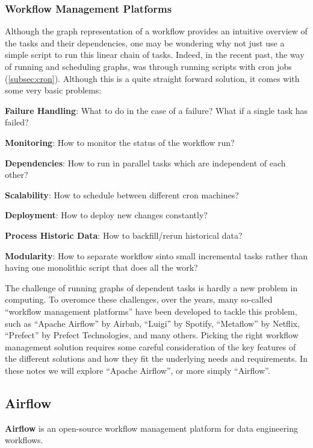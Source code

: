 \subsubsection{Workflow Management Platforms}

Although the graph representation of a workflow provides an intuitive overview of the tasks and their dependencies,
one may be wondering why not just use a simple script to run this linear chain of tasks. Indeed, in the recent past,
the way of running and scheduling graphs, was through running scripts with cron jobs (\ref{subsec:cron}). Although this
is a quite straight forward solution, it comes with some very basic problems:
\bit
\item \textbf{Failure Handling}: What to do in the case of a failure? What if a single task has failed?
\item \textbf{Monitoring}: How to monitor the status of the workflow run?
\item \textbf{Dependencies}: How to run in parallel tasks which are independent of each other?
\item \textbf{Scalability}: How to schedule between different cron machines?
\item \textbf{Deployment}: How to deploy new changes constantly?
\item \textbf{Process Historic Data}: How to backfill/rerun historical data?
\item \textbf{Modularity}: How to separate workflow sinto small incremental tasks rather than having one monolithic
script that does all the work?
\eit

The challenge of running graphs of dependent tasks is hardly a new problem in computing. To overomce these challenges,
over the years, many so-called ``workflow management platforms'' have been developed to tackle this problem, such as
``Apache Airflow'' by Airbnb, ``Luigi'' by Spotify, ``Metaflow'' by Netflix, ``Prefect'' by Prefect Technologies, and
many others. Picking the right workflow management solution requires some careful consideration of the key features of
the different solutions and how they fit the underlying needs and requirements. In these notes we will explore ``Apache
Airflow'', or more simply ``Airflow''.

\subsection{Airflow}

\bd[Airflow]
\textbf{Airflow} is an open-source workflow management platform for data engineering workflows.
\ed

